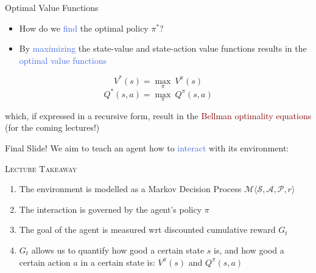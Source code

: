\documentclass{beamer}
\newenvironment{takeaway}[1]{%
	\definecolor{shadecolor}{gray}{0.9}%
		\begin{shaded}{\color{skymagenta}\noindent\textsc{#1}}\\%
		}{%
		\end{shaded}%
}
\begin{document}
\begin{frame}{Optimal Value Functions}
	\begin{itemize}
		\item How do we \textcolor{RoyalBlue}{find} the optimal policy $\pi^{*}$?
		\item By \textcolor{RoyalBlue}{maximizing} the state-value and state-action value functions results in the \textcolor{RoyalBlue}{optimal value functions}
	\end{itemize}
	\begin{multicols}{2}
		\begin{equation*}
			V^{*}(s)=\underset{\pi}{\max}\:V^{\pi}(s)
		\end{equation*}\break
		\begin{equation*}
			Q^{*}(s,a)= \underset{\pi}{\max}\:Q^{\pi}(s,a)
		\end{equation*}
	\end{multicols}

	which, if expressed in a recursive form, result in the \textcolor{Maroon}{Bellman optimality equations} (for the coming lectures!) 

\end{frame}





\begin{frame}{Final Slide!}
	We aim to teach an agent how to \textcolor{RoyalBlue}{interact} with its environment:
	\begin{takeaway}{Lecture Takeaway}
		\begin{enumerate}
			\item The environment is modelled as a Markov Decision Process $\mathcal{M}\langle \mathcal{S}, \mathcal{A}, \mathcal{P}, r \rangle$
			\item The interaction is governed by the agent's policy $\pi$
			\item The goal of the agent is measured wrt discounted cumulative reward $G_t$
			\item $G_t$ allows us to quantify how good a certain state $s$ is, and how good a certain action $a$ in a certain state is: $V^\pi(s)$ and $Q^\pi(s,a)$ 
		\end{enumerate}
	\end{takeaway}
\end{frame}
\end{document}
